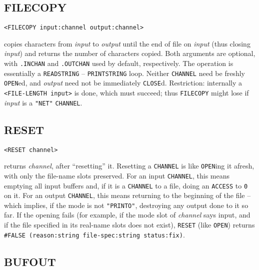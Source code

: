 \documentclass[a4paper]{scrbook}
\begin{document}
\subsection{FILECOPY}\label{filecopy}

\begin{verbatim}
<FILECOPY input:channel output:channel>
\end{verbatim}

 copies characters from \emph{input} to \emph{output} until the end of file on \emph{input}
(thus closing \emph{input}) and returns the number of characters copied. Both arguments are optional, with \texttt{.INCHAN}
and \texttt{.OUTCHAN} used by default, respectively. The operation is essentially a \texttt{READSTRING} --
\texttt{PRINTSTRING} loop. Neither \texttt{CHANNEL} need be freshly \texttt{OPEN}ed, and \emph{output} need not be
immediately \texttt{CLOSE}d. Restriction: internally a \texttt{\textless{}FILE-LENGTH\ input\textgreater{}} is done, which
must succeed; thus \texttt{FILECOPY} might lose if \emph{input} is a \texttt{"NET"} \texttt{CHANNEL}.

\subsection{RESET}\label{reset}

\begin{verbatim}
<RESET channel>
\end{verbatim}

 returns \emph{channel}, after ``resetting'' it. Resetting a \texttt{CHANNEL} is like
\texttt{OPEN}ing  it afresh, with only the file-name slots preserved. For an input \texttt{CHANNEL},
this means emptying all input buffers and, if it is a \texttt{CHANNEL} to a file, doing an \texttt{ACCESS} to \texttt{0} on
it. For an output \texttt{CHANNEL}, this means returning to the beginning of the file -- which implies, if the mode is not
\texttt{"PRINTO"}, destroying any output done to it so far. If the opening fails (for example, if the mode slot of
\emph{channel} says input, and if the file specified in its real-name slots does not exist), \texttt{RESET} (like
\texttt{OPEN}) returns \texttt{\#FALSE\ (reason:string\ file-spec:string\ status:fix)}.

\subsection{BUFOUT}\label{bufout}
\end{document}
